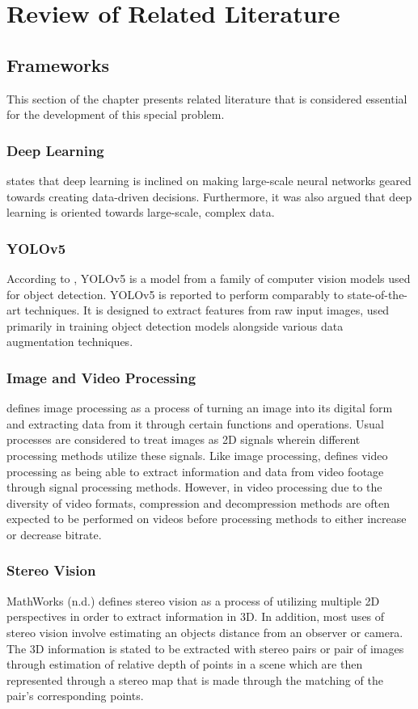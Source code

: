 \chapter{Review of Related Literature}

\section{Frameworks}
This section of the chapter presents related literature that is considered essential for the development of this special problem.

\subsection{Deep Learning}
 states that deep learning is inclined on making large-scale neural networks geared towards creating data-driven decisions. Furthermore, it was also argued that deep learning is oriented towards large-scale, complex data.

\subsection{YOLOv5}
According to , YOLOv5 is a model from a family of computer vision models used for object detection. YOLOv5 is reported to perform comparably to state-of-the-art techniques. It is designed to extract features from raw input images, used primarily in training object detection models alongside various data augmentation techniques.

\subsection{Image and Video Processing}
 defines image processing as a process of turning an image into its digital form and extracting data from it through certain functions and operations. Usual processes are considered to treat images as 2D signals wherein different processing methods utilize these signals.
Like image processing,  defines video processing as being able to extract information and data from video footage through signal processing methods. However, in video processing due to the diversity of video formats, compression and decompression methods are often expected to be performed on videos before processing methods to either increase or decrease bitrate.

\subsection{Stereo Vision}
MathWorks (n.d.) defines stereo vision as a process of utilizing multiple 2D perspectives in order to extract information in 3D. In addition, most uses of stereo vision involve estimating an objects distance from an observer or camera. The 3D information is stated to be extracted with stereo pairs or pair of images through estimation of relative depth of points in a scene which are then represented through a stereo map that is made through the matching of the pair's corresponding points.



